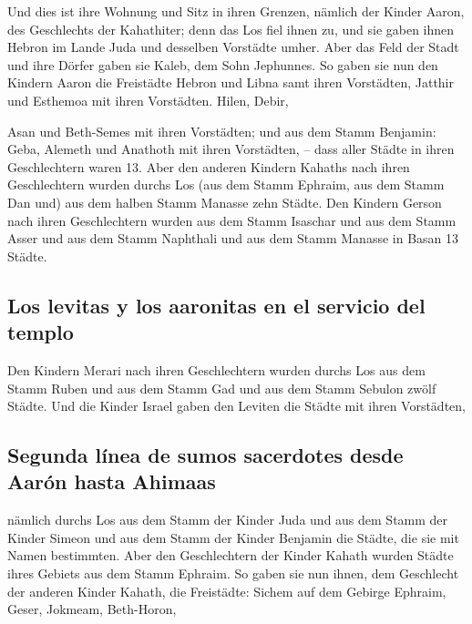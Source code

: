  Und dies ist ihre Wohnung und Sitz in ihren Grenzen,
nämlich der Kinder Aaron, des Geschlechts der Kahathiter; denn das Los
fiel ihnen zu,  und sie gaben ihnen Hebron im Lande Juda
und desselben Vorstädte umher.  Aber das Feld der Stadt
und ihre Dörfer gaben sie Kaleb, dem Sohn Jephunnes.  So
gaben sie nun den Kindern Aaron die Freistädte Hebron und Libna samt
ihren Vorstädten, Jatthir und Esthemoa mit ihren Vorstädten.
 Hilen, Debir,

 Asan und Beth-Semes mit ihren Vorstädten;
 und aus dem Stamm Benjamin: Geba, Alemeth und Anathoth
mit ihren Vorstädten, -- dass aller Städte in ihren Geschlechtern waren
13.  Aber den anderen Kindern Kahaths nach ihren
Geschlechtern wurden durchs Los (aus dem Stamm Ephraim, aus dem Stamm
Dan und) aus dem halben Stamm Manasse zehn Städte.  Den
Kindern Gerson nach ihren Geschlechtern wurden aus dem Stamm Isaschar
und aus dem Stamm Asser und aus dem Stamm Naphthali und aus dem Stamm
Manasse in Basan 13 Städte.

\hypertarget{los-levitas-y-los-aaronitas-en-el-servicio-del-templo}{%
\subsection{Los levitas y los aaronitas en el servicio del
templo}\label{los-levitas-y-los-aaronitas-en-el-servicio-del-templo}}

 Den Kindern Merari nach ihren Geschlechtern wurden
durchs Los aus dem Stamm Ruben und aus dem Stamm Gad und aus dem Stamm
Sebulon zwölf Städte.  Und die Kinder Israel gaben den
Leviten die Städte mit ihren Vorstädten,

\hypertarget{segunda-luxednea-de-sumos-sacerdotes-desde-aaruxf3n-hasta-ahimaas}{%
\subsection{Segunda línea de sumos sacerdotes desde Aarón hasta
Ahimaas}\label{segunda-luxednea-de-sumos-sacerdotes-desde-aaruxf3n-hasta-ahimaas}}

 nämlich durchs Los aus dem Stamm der Kinder Juda und aus
dem Stamm der Kinder Simeon und aus dem Stamm der Kinder Benjamin die
Städte, die sie mit Namen bestimmten.  Aber den
Geschlechtern der Kinder Kahath wurden Städte ihres Gebiets aus dem
Stamm Ephraim.  So gaben sie nun ihnen, dem Geschlecht
der anderen Kinder Kahath, die Freistädte: Sichem auf dem Gebirge
Ephraim, Geser,  Jokmeam, Beth-Horon,

